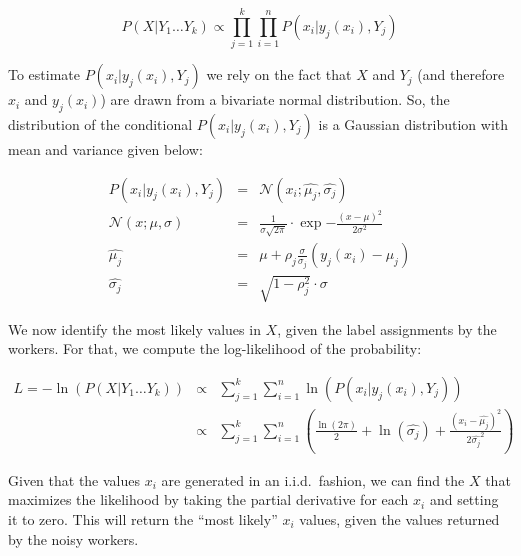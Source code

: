 \documentclass{article}
\begin{document}
\begin{equation}
\label{equ:pxgiveny}
P ( X | Y_1 \ldots Y_k) \propto  \prod_{j=1}^k \prod_{i=1}^n P (  x_i | y_j(x_i), Y_j ) 
\end{equation}

To estimate $P (  x_i | y_j(x_i), Y_j ) $ we rely on the fact that $X$ and $Y_j$ (and therefore $x_i$ and $y_j(x_i)$) are drawn from a bivariate normal distribution. So, the distribution of the conditional $P (  x_i | y_j(x_i), Y_j  )$ is a Gaussian distribution with mean and variance given below:

\begin{eqnarray}
P (  x_i | y_j(x_i), Y_j  ) &=& \mathcal{N}(x_i; \widehat{\mu_j} ,\widehat{\sigma_j} ) \nonumber \\
\mathcal{N}(x; \mu, \sigma) & = & \frac{1}{\sigma\sqrt{2\pi}} \cdot \exp{ -\frac{(x-\mu)^2}{2\sigma^2} } \nonumber \\
\widehat{\mu_j} &= &\mu + \rho_j \frac{\sigma}{\sigma_j} (y_j(x_i) - \mu_j) \nonumber \\
\widehat{\sigma_j} &=&\sqrt{1-\rho_j^2} \cdot \sigma \nonumber 
\end{eqnarray}

We now identify the most likely values in $X$, given the label assignments by the workers. For that, we compute the log-likelihood of the probability:

\begin{eqnarray}
L = -\ln\left(P ( X | Y_1 \ldots Y_k)\right) 
&\propto&  \sum_{j=1}^k \sum_{i=1}^n \ln(P (  x_i | y_j(x_i), Y_j )) \nonumber \\
&\propto&  \sum_{j=1}^k \sum_{i=1}^n \left( \frac{\ln(2\pi)}{2}+ \ln(\widehat{\sigma_j}) + \frac{(x_i-\widehat{\mu_j})^2}{2\widehat{\sigma_j}^2} \right) \nonumber 
\end{eqnarray}

Given that the values $x_i$ are generated in an i.i.d.\ fashion, we can find the $X$ that maximizes the likelihood by taking the partial derivative for each $x_i$ and setting it to zero. This will return the ``most likely'' $x_i$ values, given the values returned by the noisy workers.
\end{document}
